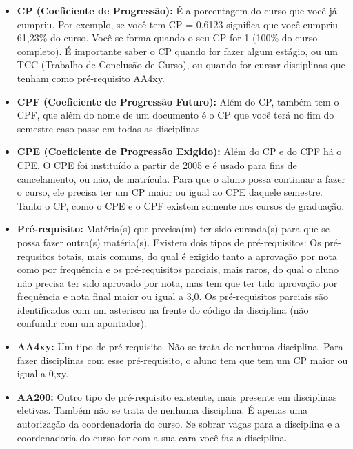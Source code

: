 \begin{itemize}
    \item  \textbf{CP (Coeficiente de Progressão):} É a porcentagem do curso que
        você já cumpriu. Por exemplo, se você tem CP = 0,6123 significa que você
        cumpriu 61,23\% do curso. Você se forma quando o seu CP for 1 (100\% do
        curso completo). É importante saber o CP quando for fazer algum estágio,
        ou um TCC (Trabalho de Conclusão de Curso), ou quando for cursar
        disciplinas que tenham como pré-requisito AA4xy.

    \item  \textbf{CPF (Coeficiente de Progressão Futuro):} Além do CP, também
        tem o CPF, que além do nome de um documento é o CP que você terá no fim
        do semestre caso passe em todas as disciplinas.

    \item  \textbf{CPE (Coeficiente de Progressão Exigido):} Além do CP e do CPF
        há o CPE. O CPE foi instituído a partir de 2005 e é usado para fins de
        cancelamento, ou não, de matrícula. Para que o aluno possa continuar a
        fazer o curso, ele precisa ter um CP maior ou igual ao CPE daquele
        semestre. Tanto o CP, como o CPE e o CPF existem somente nos cursos de
        graduação.

    \item  \textbf{Pré-requisito:} Matéria(s) que precisa(m) ter sido cursada(s)
        para que se possa fazer outra(s) matéria(s). Existem dois tipos de
        pré-requisitos: Os pré-requsitos totais, mais comuns, do qual é exigido
        tanto a aprovação por nota como por frequência e os pré-requisitos
        parciais, mais raros, do qual o aluno não precisa ter sido aprovado por
        nota, mas tem que ter tido aprovação por frequência e nota final maior
        ou igual a 3,0. Os pré-requisitos parciais são identificados com um
        asterisco na frente do código da disciplina (não confundir com um
        apontador).

    \item  \textbf{AA4xy:} Um tipo de pré-requisito. Não se trata de nenhuma
        disciplina. Para fazer disciplinas com esse pré-requisito, o aluno tem
        que tem um CP maior ou igual a 0,xy.

    \item  \textbf{AA200:} Outro tipo de pré-requisito existente, mais presente
        em disciplinas eletivas. Também não se trata de nenhuma disciplina. É
        apenas uma autorização da coordenadoria do curso. Se sobrar vagas para a
        disciplina e a coordenadoria do curso for com a sua cara você faz a
        disciplina.


\end{itemize}
